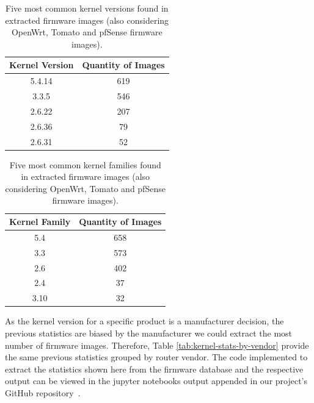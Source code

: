 \begin{table}[H]
\centering
\caption{Five most common kernel versions found in extracted firmware images (also considering OpenWrt, Tomato and pfSense firmware images).}
\begin{tabular}{|c|c|}
\hline
\textbf{Kernel Version} & \textbf{Quantity of Images} \\ \hline
5.4.14                  & 619                \\
3.3.5                   & 546                \\
2.6.22                  & 207                \\
2.6.36                  & 79                 \\
2.6.31                  & 52                 \\ \hline
\end{tabular}
\label{tab:kernel-stats-openwrt}
\end{table}

\begin{table}[H]
\centering
\caption{Five most common kernel families found in extracted firmware images (also considering OpenWrt, Tomato and pfSense firmware images).}
\begin{tabular}{|c|c|}
\hline
\textbf{Kernel Family} & \textbf{Quantity of Images} \\ \hline
5.4                    & 658                \\ 
3.3                    & 573                \\ 
2.6                    & 402                \\ 
2.4                    & 37                 \\ 
3.10                   & 32                 \\ \hline
\end{tabular}
\label{tab:kernel-family-stats-openwrt}
\end{table}

As the kernel version for a specific product is a manufacturer decision, the previous statistics are biased by the manufacturer we could extract the most number of firmware images. Therefore, Table \ref{tab:kernel-stats-by-vendor} provide the same previous statistics grouped by router vendor. The code implemented to extract the statistics shown here from the firmware database and the respective output can be viewed in the jupyter notebooks output appended in our project's GitHub repository~\cite{github:c2dc-toso}. 

